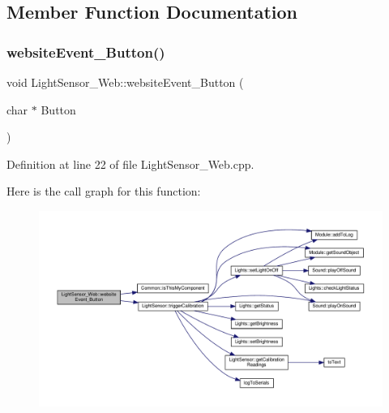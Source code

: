 \subsection{Member Function Documentation}
\mbox{\label{class_light_sensor___web_abedb4cd4454f322ebbd7c3753bcd2a73}} 
\subsubsection{\texorpdfstring{website\+Event\+\_\+\+Button()}{websiteEvent\_Button()}}
{\footnotesize\ttfamily void Light\+Sensor\+\_\+\+Web\+::website\+Event\+\_\+\+Button (\begin{DoxyParamCaption}\item[{char $\ast$}]{Button }\end{DoxyParamCaption})}



Definition at line 22 of file Light\+Sensor\+\_\+\+Web.\+cpp.

Here is the call graph for this function\+:
\nopagebreak
\begin{figure}[H]
\begin{center}
\leavevmode
\includegraphics[width=350pt]{class_light_sensor___web_abedb4cd4454f322ebbd7c3753bcd2a73_cgraph}
\end{center}
\end{figure}
\mbox{\label{class_light_sensor___web_af16ca5f334562e0b66ffe14ec0274c52}} 

